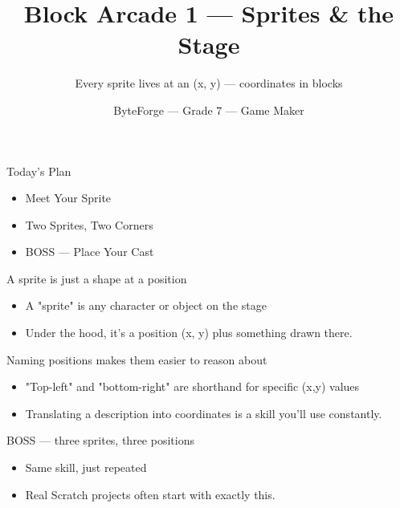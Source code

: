 \documentclass[aspectratio=169]{beamer}
\title{Block Arcade 1 — Sprites \& the Stage}
\subtitle{Every sprite lives at an (x, y) — coordinates in blocks}
\author{ByteForge --- Grade 7 --- Game Maker}
\date{}
\begin{document}
\begin{frame}
    \titlepage
\end{frame}

\begin{frame}{Today's Plan}
    \begin{itemize}
        \item Meet Your Sprite
        \item Two Sprites, Two Corners
        \item[$\bigstar$] BOSS --- Place Your Cast
    \end{itemize}
\end{frame}

\begin{frame}{A sprite is just a shape at a position}
    \large
    \begin{itemize}
        \item A "sprite" is any character or object on the stage
        \item Under the hood, it's a position (x, y) plus something drawn there.
    \end{itemize}

    \begin{center}
    \end{center}
\end{frame}


\begin{frame}{Naming positions makes them easier to reason about}
    \large
    \begin{itemize}
        \item "Top-left" and "bottom-right" are shorthand for specific (x,y) values
        \item Translating a description into coordinates is a skill you'll use constantly.
    \end{itemize}
\end{frame}


\begin{frame}{BOSS — three sprites, three positions}
    \large
    \begin{itemize}
        \item Same skill, just repeated
        \item Real Scratch projects often start with exactly this.
    \end{itemize}
\end{frame}
\end{document}
